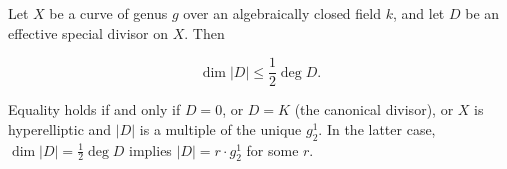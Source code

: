Let $X$ be a curve of genus $g$ over an algebraically closed field $k$, and let $D$ be an effective special divisor on $X$. Then

$$\dim|D| \leqslant \frac{1}{2} \deg D.$$

Equality holds if and only if $D = 0$, or $D = K$ (the canonical divisor), or $X$ is hyperelliptic and $|D|$ is a multiple of the unique $g_2^1$. In the latter case, $\dim|D| = \frac{1}{2} \deg D$ implies $|D| = r \cdot g_2^1$ for some $r$.
